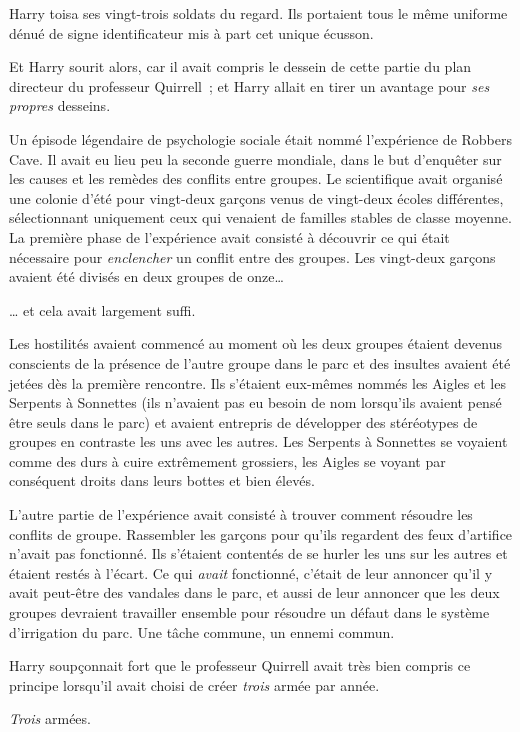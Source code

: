 Harry toisa ses vingt-trois soldats du regard. Ils portaient tous le même uniforme dénué de signe identificateur mis à part cet unique écusson.

Et Harry sourit alors, car il avait compris le dessein de cette partie du plan directeur du professeur Quirrell~; et Harry allait en tirer un avantage pour \emph{ses propres} desseins.

Un épisode légendaire de psychologie sociale était nommé l'expérience de Robbers Cave. Il avait eu lieu peu la seconde guerre mondiale, dans le but d'enquêter sur les causes et les remèdes des conflits entre groupes. Le scientifique avait organisé une colonie d'été pour vingt-deux garçons venus de vingt-deux écoles différentes, sélectionnant uniquement ceux qui venaient de familles stables de classe moyenne. La première phase de l'expérience avait consisté à découvrir ce qui était nécessaire pour \emph{enclencher} un conflit entre des groupes. Les vingt-deux garçons avaient été divisés en deux groupes de onze…

… et cela avait largement suffi.

Les hostilités avaient commencé au moment où les deux groupes étaient devenus conscients de la présence de l'autre groupe dans le parc et des insultes avaient été jetées dès la première rencontre. Ils s'étaient eux-mêmes nommés les Aigles et les Serpents à Sonnettes (ils n'avaient pas eu besoin de nom lorsqu'ils avaient pensé être seuls dans le parc) et avaient entrepris de développer des stéréotypes de groupes en contraste les uns avec les autres. Les Serpents à Sonnettes se voyaient comme des durs à cuire extrêmement grossiers, les Aigles se voyant par conséquent droits dans leurs bottes et bien élevés.

L'autre partie de l'expérience avait consisté à trouver comment résoudre les conflits de groupe. Rassembler les garçons pour qu'ils regardent des feux d'artifice n'avait pas fonctionné. Ils s'étaient contentés de se hurler les uns sur les autres et étaient restés à l'écart. Ce qui \emph{avait} fonctionné, c'était de leur annoncer qu'il y avait peut-être des vandales dans le parc, et aussi de leur annoncer que les deux groupes devraient travailler ensemble pour résoudre un défaut dans le système d'irrigation du parc. Une tâche commune, un ennemi commun.

Harry soupçonnait fort que le professeur Quirrell avait très bien compris ce principe lorsqu'il avait choisi de créer \emph{trois} armée par année.

\emph{Trois} armées.


